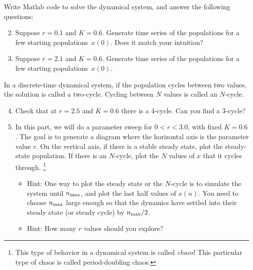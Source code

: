 \documentclass{exam}
\begin{document}
Write Matlab code to solve the dynamical system, and answer the following questions:
\begin{enumerate}
\setcounter{enumi}{1}
\item Suppose $r=0.1$ and $K=0.6$. Generate time series of the populations for a few starting populations~$x(0)$. Does it match your intuition?
\item Suppose $r=2.1$ and $K=0.6$. Generate time series of the populations for a few starting populations~$x(0)$. 
\end{enumerate}
In a discrete-time dynamical system, if the population cycles between two values, the solution is called a two-cycle. Cycling between $N$ values is called an $N$-cycle. 
\begin{enumerate}
\setcounter{enumi}{3}
\item Check that at $r=2.5$ and $K=0.6$ there is a 4-cycle. Can you find a 3-cycle?
\item In this part, we will do a parameter sweep for $0<r<3.0$, with fixed $K=0.6$. The goal is to generate a diagram where the horizontal axis is the parameter value $r$. On the vertical axis, if there is a stable steady state, plot the steady-state population. If there is an $N$-cycle, plot the $N$ values of $x$ that it cycles through. \footnote{This type of behavior in a dynamical system is called \emph{chaos}! This particular type of chaos is called period-doubling chaos.}
\begin{itemize}
\item Hint: One way to plot the steady state or the $N$-cycle is to simulate the system until $n_{\rm max}$, and plot the last half values of $x(n)$. You need to choose $n_{\rm max}$ large enough so that the dynamics have settled into their steady state (or steady cycle) by $n_{\rm max}/2$.
\item Hint: How many $r$ values should you explore? 
\end{itemize}
\end{enumerate}

  
\end{document}
